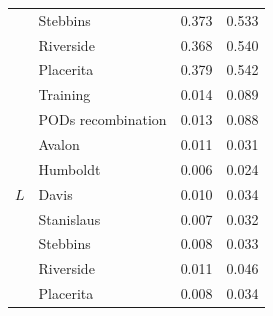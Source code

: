 \documentclass[a4paper, 12pt]{article}
\begin{document}
\begin{table}[ht]
\begin{tabular}{clll}
                                                           & Stebbins           & 0.373 & 0.533\\
                                                           & Riverside          & 0.368 & 0.540\\
                                                           & Placerita          & 0.379 & 0.542\\ 
\hline
\multirow{9}{*}{$L$}                            & Training           & 0.014  & 0.089 \\
                                                           & PODs recombination & 0.013 & 0.088 \\
                                                           & Avalon             & 0.011 & 0.031 \\
                                                           & Humboldt        & 0.006 & 0.024\\
                                                           & Davis              & 0.010 & 0.034\\
                                                           & Stanislaus       & 0.007 & 0.032\\
                                                           & Stebbins          & 0.008 & 0.033 \\
                                                           & Riverside         & 0.011 & 0.046\\
                                                           & Placerita          & 0.008 & 0.034\\ 
\hline
\end{tabular}
\label{tab:supple_neutral_mse}
\end{table}
\end{document}
